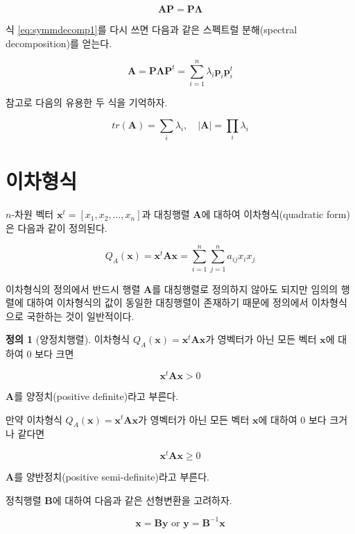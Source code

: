 \documentclass[
]{book}
\theoremstyle{definition}
\newtheorem{definition}{정의}[chapter]
\theoremstyle{definition}
\theoremstyle{definition}
\theoremstyle{remark}
\begin{document}
\[ \bm A \bm P = \bm P \bm \Lambda \]

식 \eqref{eq:symmdecomp1}를 다시 쓰면 다음과 같은 스펙트럴 분해(spectral decomposition)를 얻는다.

\begin{equation}
 \bm A  = \bm P \bm \Lambda \bm P^t  = \sum_{i=1}^n \lambda_i \bm p_i \bm {p}_i^t 
 \label{eq:spectral}
\end{equation}

참고로 다음의 유용한 두 식을 기억하자.

\[ tr(\bm A) = \sum_i \lambda_i ,\quad |\bm A| = \prod_i \lambda_i \]

\hypertarget{uxc774uxcc28uxd615uxc2dd}{%
\section{이차형식}\label{uxc774uxcc28uxd615uxc2dd}}

\(n\)-차원 벡터 \(\bm x^t=[x_1,x_2,\dots,x_n]\)과 대칭행렬 \(\bm A\)에 대하여 이차형식(quadratic form)은 다음과 같이 정의된다.

\begin{equation}
Q_A(\bm x) = \bm x^t \bm A \bm x =\sum_{i=1}^n \sum_{j=1}^n a_{ij} x_i x_j 
\label{eq:quadratic}
\end{equation}

이차형식의 정의에서 반드시 행렬 \(\bm A\)를 대칭행렬로 정의하지 않아도 되지만 임의의 행렬에 대하여 이차형식의 값이 동일한 대칭행렬이 존재하기 때문에 정의에서 이차형식으로 국한하는 것이 일반적이다.

\begin{definition}[양정치행렬]
\protect\hypertarget{def:unnamed-chunk-24}{}{\label{def:unnamed-chunk-24} {} }
이차형식 \(Q_A(\bm x) = \bm x^t \bm A \bm x\)가 영벡터가 아닌 모든 벡터 \(\bm x\)에 대하여 0 보다 크면

\[ \bm x^t \bm A \bm x  >0 \]

\(\bm A\)를 양정치(positive definite)라고 부른다.

만약 이차형식 \(Q_A(\bm x) = \bm x^t \bm A \bm x\)가 영벡터가 아닌 모든 벡터 \(\bm x\)에 대하여 0 보다 크거나 같다면

\[ \bm x^t \bm A \bm x  \ge 0 \]

\(\bm A\)를 양반정치(positive semi-definite)라고 부른다.
\end{definition}

정칙행렬 \(\bm B\)에 대하여 다음과 같은 선형변환을 고려하자.

\[   \bm x = \bm B \bm y \text{ or } \bm y = \bm {B}^{-1} \bm x \]
\end{document}
